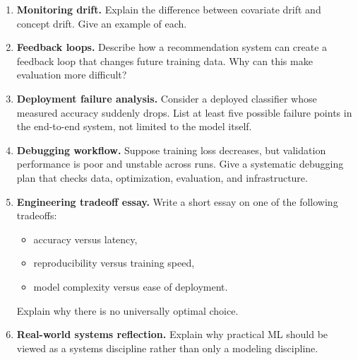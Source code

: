\begin{enumerate}
    \item \textbf{Monitoring drift.}
    Explain the difference between covariate drift and concept drift. Give an example of each.

    \item \textbf{Feedback loops.}
    Describe how a recommendation system can create a feedback loop that changes future training data. Why can this make evaluation more difficult?

    \item \textbf{Deployment failure analysis.}
    Consider a deployed classifier whose measured accuracy suddenly drops. List at least five possible failure points in the end-to-end system, not limited to the model itself.

    \item \textbf{Debugging workflow.}
    Suppose training loss decreases, but validation performance is poor and unstable across runs. Give a systematic debugging plan that checks data, optimization, evaluation, and infrastructure.

    \item \textbf{Engineering tradeoff essay.}
    Write a short essay on one of the following tradeoffs:
    \begin{itemize}
        \item accuracy versus latency,
        \item reproducibility versus training speed,
        \item model complexity versus ease of deployment.
    \end{itemize}
    Explain why there is no universally optimal choice.

    \item \textbf{Real-world systems reflection.}
    Explain why practical ML should be viewed as a systems discipline rather than only a modeling discipline.
\end{enumerate}